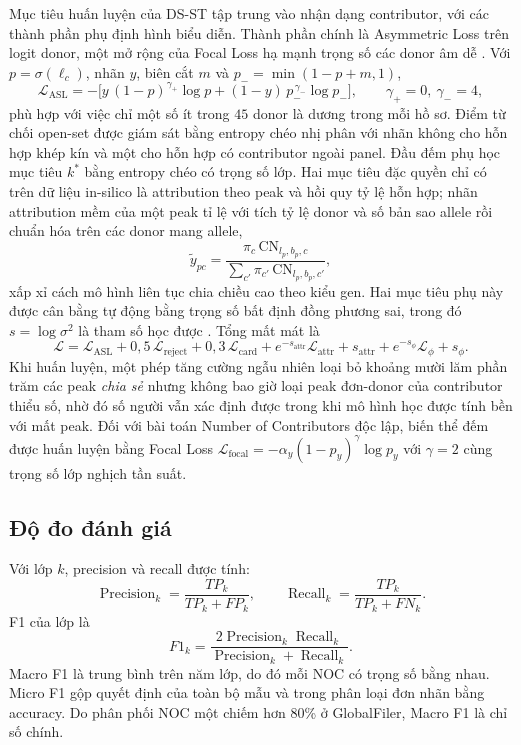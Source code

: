 \documentclass[12pt,a4paper]{article}
\begin{document}
Mục tiêu huấn luyện của DS-ST tập trung vào nhận dạng contributor, với các thành phần phụ định hình biểu diễn. Thành phần chính là Asymmetric Loss trên logit donor, một mở rộng của Focal Loss hạ mạnh trọng số các donor âm dễ \cite{lin2017}. Với \(p=\sigma(\ell_c)\), nhãn \(y\), biên cắt \(m\) và \(p_-=\min(1-p+m,1)\),
\begin{equation}
\mathcal{L}_{\mathrm{ASL}}=-\Big[y\,(1-p)^{\gamma_+}\log p+(1-y)\,p_-^{\,\gamma_-}\log p_-\Big],
\qquad \gamma_+=0,\ \gamma_-=4,
\end{equation}
phù hợp với việc chỉ một số ít trong \(45\) donor là dương trong mỗi hồ sơ. Điểm từ chối open-set được giám sát bằng entropy chéo nhị phân với nhãn không cho hỗn hợp khép kín và một cho hỗn hợp có contributor ngoài panel. Đầu đếm phụ học mục tiêu \(k^{*}\) bằng entropy chéo có trọng số lớp. Hai mục tiêu đặc quyền chỉ có trên dữ liệu in-silico là attribution theo peak và hồi quy tỷ lệ hỗn hợp; nhãn attribution mềm của một peak tỉ lệ với tích tỷ lệ donor và số bản sao allele rồi chuẩn hóa trên các donor mang allele,
\begin{equation}
\tilde{y}_{pc}=\frac{\pi_c\,\mathrm{CN}_{l_p,b_p,c}}{\sum_{c'}\pi_{c'}\,\mathrm{CN}_{l_p,b_p,c'}},
\end{equation}
xấp xỉ cách mô hình liên tục chia chiều cao theo kiểu gen. Hai mục tiêu phụ này được cân bằng tự động bằng trọng số bất định đồng phương sai, trong đó \(s=\log\sigma^2\) là tham số học được \cite{kendall2018}. Tổng mất mát là
\begin{equation}
\mathcal{L}=\mathcal{L}_{\mathrm{ASL}}+0{,}5\,\mathcal{L}_{\mathrm{reject}}+0{,}3\,\mathcal{L}_{\mathrm{card}}
+e^{-s_{\mathrm{attr}}}\mathcal{L}_{\mathrm{attr}}+s_{\mathrm{attr}}
+e^{-s_{\phi}}\mathcal{L}_{\phi}+s_{\phi}.
\end{equation}
Khi huấn luyện, một phép tăng cường ngẫu nhiên loại bỏ khoảng mười lăm phần trăm các peak \emph{chia sẻ} nhưng không bao giờ loại peak đơn-donor của contributor thiểu số, nhờ đó số người vẫn xác định được trong khi mô hình học được tính bền với mất peak. Đối với bài toán Number of Contributors độc lập, biến thể đếm được huấn luyện bằng Focal Loss \(\mathcal{L}_{\mathrm{focal}}=-\alpha_y(1-p_y)^{\gamma}\log p_y\) với \(\gamma=2\) cùng trọng số lớp nghịch tần suất.

\subsection{Độ đo đánh giá}

Với lớp \(k\), precision và recall được tính:
\begin{equation}
\operatorname{Precision}_k=\frac{TP_k}{TP_k+FP_k},
\qquad
\operatorname{Recall}_k=\frac{TP_k}{TP_k+FN_k}.
\end{equation}
F1 của lớp là
\begin{equation}
F1_k=\frac{2\operatorname{Precision}_k\operatorname{Recall}_k}
{\operatorname{Precision}_k+\operatorname{Recall}_k}.
\end{equation}
Macro F1 là trung bình trên năm lớp, do đó mỗi NOC có trọng số bằng nhau. Micro F1 gộp quyết định của toàn bộ mẫu và trong phân loại đơn nhãn bằng accuracy. Do phân phối NOC một chiếm hơn 80\% ở GlobalFiler, Macro F1 là chỉ số chính.
\end{document}
